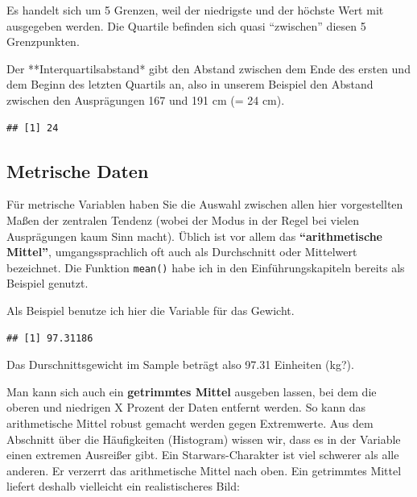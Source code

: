 \documentclass[
]{book}
\newenvironment{Shaded}{\begin{snugshade}}{\end{snugshade}}
\newcommand{\AttributeTok}[1]{\textcolor[rgb]{0.77,0.63,0.00}{#1}}
\newcommand{\ConstantTok}[1]{\textcolor[rgb]{0.00,0.00,0.00}{#1}}
\newcommand{\FunctionTok}[1]{\textcolor[rgb]{0.00,0.00,0.00}{#1}}
\newcommand{\NormalTok}[1]{#1}
\newcommand{\SpecialCharTok}[1]{\textcolor[rgb]{0.00,0.00,0.00}{#1}}
\begin{document}
Es handelt sich um 5 Grenzen, weil der niedrigste und der höchste Wert mit ausgegeben werden. Die Quartile befinden sich quasi ``zwischen'' diesen 5 Grenzpunkten.

Der **Interquartilsabstand* gibt den Abstand zwischen dem Ende des ersten und dem Beginn des letzten Quartils an, also in unserem Beispiel den Abstand zwischen den Ausprägungen 167 und 191 cm (= 24 cm).

\begin{Shaded}
\end{Shaded}

\begin{verbatim}
## [1] 24
\end{verbatim}

\hypertarget{metrische-daten}{%
\subsection{Metrische Daten}\label{metrische-daten}}

Für metrische Variablen haben Sie die Auswahl zwischen allen hier vorgestellten Maßen der zentralen Tendenz (wobei der Modus in der Regel bei vielen Ausprägungen kaum Sinn macht). Üblich ist vor allem das \textbf{``arithmetische Mittel''}, umgangssprachlich oft auch als Durchschnitt oder Mittelwert bezeichnet. Die Funktion \texttt{mean()} habe ich in den Einführungskapiteln bereits als Beispiel genutzt.

Als Beispiel benutze ich hier die Variable für das Gewicht.

\begin{Shaded}
\end{Shaded}

\begin{verbatim}
## [1] 97.31186
\end{verbatim}

Das Durschnittsgewicht im Sample beträgt also 97.31 Einheiten (kg?).

Man kann sich auch ein \textbf{getrimmtes Mittel} ausgeben lassen, bei dem die oberen und niedrigen X Prozent der Daten entfernt werden. So kann das arithmetische Mittel robust gemacht werden gegen Extremwerte. Aus dem Abschnitt über die Häufigkeiten (Histogram) wissen wir, dass es in der Variable einen extremen Ausreißer gibt. Ein Starwars-Charakter ist viel schwerer als alle anderen. Er verzerrt das arithmetische Mittel nach oben. Ein getrimmtes Mittel liefert deshalb vielleicht ein realistischeres Bild:
\end{document}
